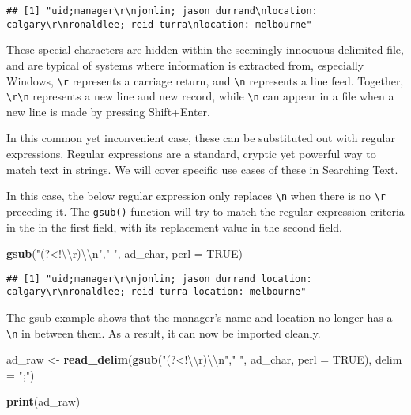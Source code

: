 \documentclass[
]{book}
\newenvironment{Shaded}{\begin{snugshade}}{\end{snugshade}}
\newcommand{\CharTok}[1]{\textcolor[rgb]{0.31,0.60,0.02}{#1}}
\newcommand{\DataTypeTok}[1]{\textcolor[rgb]{0.13,0.29,0.53}{#1}}
\newcommand{\KeywordTok}[1]{\textcolor[rgb]{0.13,0.29,0.53}{\textbf{#1}}}
\newcommand{\NormalTok}[1]{#1}
\newcommand{\OtherTok}[1]{\textcolor[rgb]{0.56,0.35,0.01}{#1}}
\newcommand{\StringTok}[1]{\textcolor[rgb]{0.31,0.60,0.02}{#1}}
\begin{document}
\begin{verbatim}
## [1] "uid;manager\r\njonlin; jason durrand\nlocation: calgary\r\nronaldlee; reid turra\nlocation: melbourne"
\end{verbatim}

These special characters are hidden within the seemingly innocuous delimited file, and are typical of systems where information is extracted from, especially Windows, \texttt{\textbackslash{}r} represents a carriage return, and \texttt{\textbackslash{}n} represents a line feed. Together, \texttt{\textbackslash{}r\textbackslash{}n} represents a new line and new record, while \texttt{\textbackslash{}n} can appear in a file when a new line is made by pressing Shift+Enter.

In this common yet inconvenient case, these can be substituted out with regular expressions. Regular expressions are a standard, cryptic yet powerful way to match text in strings. We will cover specific use cases of these in \protect\hypertarget{test-searchtext}{}{Searching Text}.

In this case, the below regular expression only replaces \texttt{\textbackslash{}n} when there is no \texttt{\textbackslash{}r} preceding it. The \texttt{gsub()} function will try to match the regular expression criteria in the in the first field, with its replacement value in the second field.

\begin{Shaded}
\begin{Highlighting}[]
\KeywordTok{gsub}\NormalTok{(}\StringTok{"(?<!}\CharTok{\textbackslash{}\textbackslash{}}\StringTok{r)}\CharTok{\textbackslash{}\textbackslash{}}\StringTok{n"}\NormalTok{,}\StringTok{" "}\NormalTok{, ad_char, }\DataTypeTok{perl =} \OtherTok{TRUE}\NormalTok{)}
\end{Highlighting}
\end{Shaded}

\begin{verbatim}
## [1] "uid;manager\r\njonlin; jason durrand location: calgary\r\nronaldlee; reid turra location: melbourne"
\end{verbatim}

The gsub example shows that the manager's name and location no longer has a \texttt{\textbackslash{}n} in between them. As a result, it can now be imported cleanly.

\begin{Shaded}
\begin{Highlighting}[]
\NormalTok{ad_raw <-}\StringTok{ }\KeywordTok{read_delim}\NormalTok{(}\KeywordTok{gsub}\NormalTok{(}\StringTok{"(?<!}\CharTok{\textbackslash{}\textbackslash{}}\StringTok{r)}\CharTok{\textbackslash{}\textbackslash{}}\StringTok{n"}\NormalTok{,}\StringTok{" "}\NormalTok{, ad_char, }\DataTypeTok{perl =} \OtherTok{TRUE}\NormalTok{), }\DataTypeTok{delim =} \StringTok{";"}\NormalTok{)}

\KeywordTok{print}\NormalTok{(ad_raw)}
\end{Highlighting}
\end{Shaded}
\end{document}
